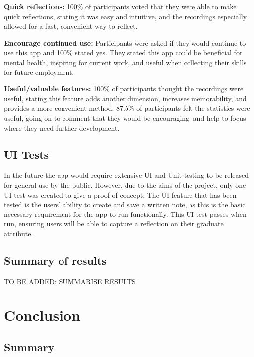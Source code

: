 \documentclass{l4proj}
\begin{document}
\textbf{Quick reflections:} 100\% of participants voted that they were able to make quick reflections, stating it was easy and intuitive, and the recordings especially allowed for a fast, convenient way to reflect.

\textbf{Encourage continued use:} Participants were asked if they would continue to use this app and 100\% stated yes. They stated this app could be beneficial for mental health, inspiring for current work, and useful when collecting their skills for future employment. 

\textbf{Useful/valuable features:} 100\% of participants thought the recordings were useful, stating this feature adds another dimension, increases memorability, and provides a more convenient method. 87.5\% of participants felt the statistics were useful, going on to comment that they would be encouraging, and help to focus where they need further development.


\section{UI Tests}

In the future the app would require extensive UI and Unit testing to be released for general use by the public. However, due to the aims of the project, only one UI test was created to give a proof of concept. The UI feature that has been tested is the users' ability to create and save a written note, as this is the basic necessary requirement for the app to run functionally. This UI test passes when run, ensuring users will be able to capture a reflection on their graduate attribute.

\section{Summary of results}

TO BE ADDED: SUMMARISE RESULTS


\chapter{Conclusion}  

\section{Summary}
\end{document}
